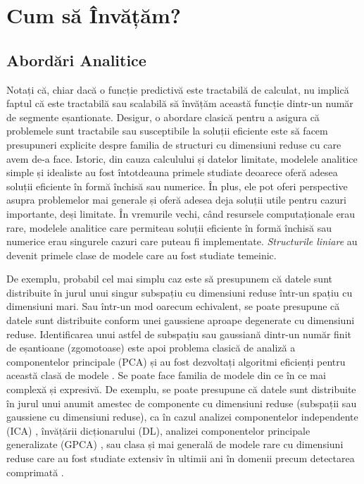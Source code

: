 \documentclass[../../book-main_ro.tex]{subfiles}
\begin{document}
\section{Cum să Învățăm?}


\subsection{Abordări Analitice}
\label{sec:analytical}
Notați că, chiar dacă o funcție predictivă este tractabilă de calculat, nu implică faptul că este tractabilă sau scalabilă să învățăm această funcție dintr-un număr de segmente eșantionate. Desigur, o abordare clasică pentru a asigura că problemele sunt tractabile sau susceptibile la soluții eficiente este să facem presupuneri explicite despre familia de structuri cu dimensiuni reduse cu care avem de-a face. Istoric, din cauza calculului și datelor limitate, modelele analitice simple și idealiste au fost întotdeauna primele studiate deoarece oferă adesea soluții eficiente în formă închisă sau numerice. În plus, ele pot oferi perspective asupra problemelor mai generale și oferă adesea deja soluții utile pentru cazuri importante, deși limitate. În vremurile vechi, când resursele computaționale erau rare, modelele analitice care permiteau soluții eficiente în formă închisă sau numerice erau singurele cazuri care puteau fi implementate. {\em Structurile liniare} au devenit primele clase de modele care au fost studiate temeinic.

De exemplu, probabil cel mai simplu caz este să presupunem că datele sunt distribuite în jurul unui singur subspațiu cu dimensiuni reduse într-un spațiu cu dimensiuni mari. Sau într-un mod oarecum echivalent, se poate presupune că datele sunt distribuite conform unei gaussiene aproape degenerate cu dimensiuni reduse. Identificarea unui astfel de subspațiu sau gaussiană dintr-un număr finit de eșantioane (zgomotoase) este apoi problema clasică de analiză a componentelor principale (PCA) și au fost dezvoltați algoritmi eficienți pentru această clasă de modele \cite{JolliffeI2002}. Se poate face familia de modele din ce în ce mai complexă și expresivă. De exemplu, se poate presupune că datele sunt distribuite în jurul unui anumit amestec de componente cu dimensiuni reduse (subspații sau gaussiene cu dimensiuni reduse), ca în cazul analizei componentelor independente (ICA) \cite{Ans-1985}, învățării dicționarului (DL), analizei componentelor principale generalizate (GPCA) \cite{Vidal-GPCA}, sau clasa și mai generală de modele rare cu dimensiuni reduse care au fost studiate extensiv în ultimii ani în domenii precum detectarea comprimată \cite{Wright-Ma-2022}.
\end{document}
